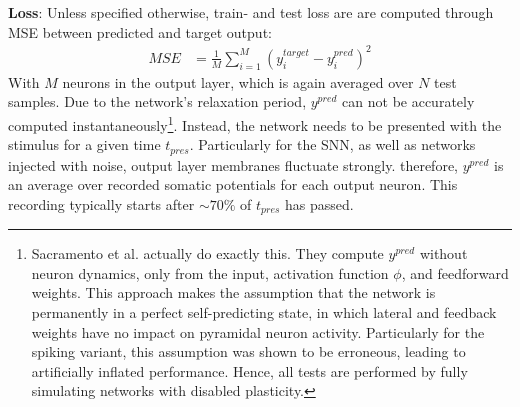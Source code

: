 \textbf{Loss}: Unless specified otherwise, train- and test loss are are computed through MSE between predicted and
target output:
\begin{align*}
  MSE & = \frac{1}{M} \sum_{i=1}^M \left( y^{target}_i-y^{pred}_i \right)^2
\end{align*}
With $M$ neurons in the output layer, which is again averaged over $N$ test samples. Due to the network's relaxation
period, $y^{pred}$ can not be accurately computed instantaneously\footnote{Sacramento et al. actually do exactly this.
  They compute $y^{pred}$ without neuron dynamics, only from the input, activation function $\phi$, and feedforward
  weights. This approach makes the assumption that the network is permanently in a perfect self-predicting state, in
  which lateral and feedback weights have no impact on pyramidal neuron activity. Particularly for the spiking variant,
  this assumption was shown to be erroneous, leading to artificially inflated performance. Hence, all tests are
  performed by fully simulating networks with disabled plasticity.}. Instead, the network needs to be presented with the
stimulus for a given time $t_{pres}$. Particularly for the SNN, as well as networks injected with noise, output layer
membranes fluctuate strongly. therefore, $y^{pred}$ is an average over recorded somatic potentials for each output
neuron. This recording typically starts after $\sim 70\%$ of $t_{pres}$ has passed.